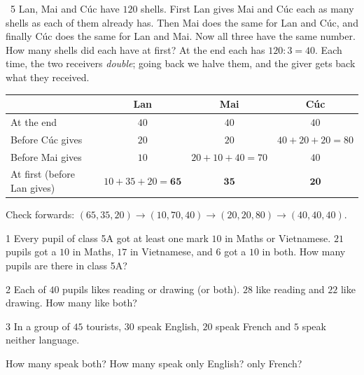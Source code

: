 \begin{exbox}{\ExWord\ 5}
Lan, Mai and Cúc have $120$ shells. First Lan gives Mai and Cúc each as many shells as each of them already has. Then Mai does the same for Lan and Cúc, and finally Cúc does the same for Lan and Mai. Now all three have the same number. How many shells did each have at first?
\guide
At the end each has $120:3=40$. Each time, the two receivers \emph{double}; going back we halve them, and the giver gets back what they received.
\begin{center}
\renewcommand{\arraystretch}{1.25}
\begin{tabular}{|l|c|c|c|}
\hline
 & Lan & Mai & Cúc\\\hline
At the end & $40$ & $40$ & $40$\\\hline
Before Cúc gives & $20$ & $20$ & $40+20+20=80$\\\hline
Before Mai gives & $10$ & $20+10+40=70$ & $40$\\\hline
At first (before Lan gives) & $10+35+20=\mathbf{65}$ & $\mathbf{35}$ & $\mathbf{20}$\\\hline
\end{tabular}
\end{center}
Check forwards: $(65,35,20)\to(10,70,40)\to(20,20,80)\to(40,40,40)$.
\end{exbox}
\begin{probbox}{1}{\relax}
Every pupil of class 5A got at least one mark $10$ in Maths or Vietnamese. $21$ pupils got a $10$ in Maths, $17$ in Vietnamese, and $6$ got a $10$ in both. How many pupils are there in class 5A?
\end{probbox}
\gap
\begin{probbox}{2}{\relax}
Each of $40$ pupils likes reading or drawing (or both). $28$ like reading and $22$ like drawing. How many like both?
\end{probbox}
\gap
\begin{probbox}{3}{\relax}
In a group of $45$ tourists, $30$ speak English, $20$ speak French and $5$ speak neither language.\par
{} How many speak both? \quad {} How many speak only English? \quad {} only French?
\end{probbox}

